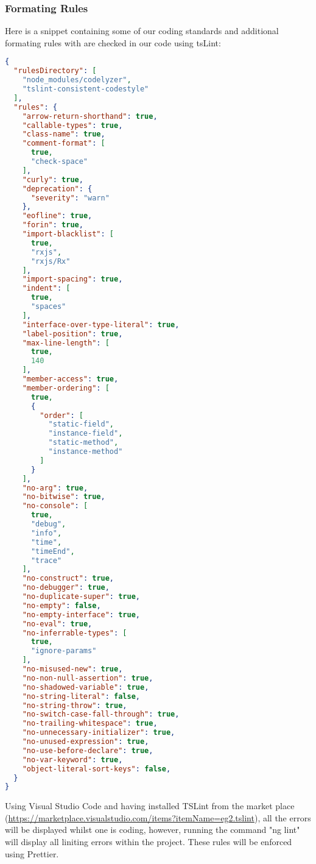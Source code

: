 \documentclass[11pt]{article}
\begin{document}
\subsubsection{Formating Rules}

Here is a snippet containing some of our coding standards and additional formating rules with are checked in our code using tsLint:
\begin{lstlisting}[language=json,firstnumber=1]
{
  "rulesDirectory": [
    "node_modules/codelyzer",
    "tslint-consistent-codestyle"
  ],
  "rules": {
    "arrow-return-shorthand": true,
    "callable-types": true,
    "class-name": true,
    "comment-format": [
      true,
      "check-space"
    ],
    "curly": true,
    "deprecation": {
      "severity": "warn"
    },
    "eofline": true,
    "forin": true,
    "import-blacklist": [
      true,
      "rxjs",
      "rxjs/Rx"
    ],
    "import-spacing": true,
    "indent": [
      true,
      "spaces"
    ],
    "interface-over-type-literal": true,
    "label-position": true,
    "max-line-length": [
      true,
      140
    ],
    "member-access": true,
    "member-ordering": [
      true,
      {
        "order": [
          "static-field",
          "instance-field",
          "static-method",
          "instance-method"
        ]
      }
    ],
    "no-arg": true,
    "no-bitwise": true,
    "no-console": [
      true,
      "debug",
      "info",
      "time",
      "timeEnd",
      "trace"
    ],
    "no-construct": true,
    "no-debugger": true,
    "no-duplicate-super": true,
    "no-empty": false,
    "no-empty-interface": true,
    "no-eval": true,
    "no-inferrable-types": [
      true,
      "ignore-params"
    ],
    "no-misused-new": true,
    "no-non-null-assertion": true,
    "no-shadowed-variable": true,
    "no-string-literal": false,
    "no-string-throw": true,
    "no-switch-case-fall-through": true,
    "no-trailing-whitespace": true,
    "no-unnecessary-initializer": true,
    "no-unused-expression": true,
    "no-use-before-declare": true,
    "no-var-keyword": true,
    "object-literal-sort-keys": false,
  }
}
\end{lstlisting}

Using Visual Studio Code and having installed TSLint from the market place (\url{https://marketplace.visualstudio.com/items?itemName=eg2.tslint}), all the errors will be displayed whilst one is coding, however, running the command "ng lint" will display all liniting errors within the project. These rules will be enforced using Prettier.
\end{document}
